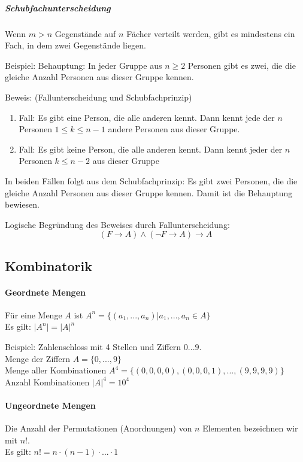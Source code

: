 \documentclass[a4paper]{scrartcl}
\begin{document}
\subparagraph{Schubfachunterscheidung} Wenn $m > n$ Gegenstände auf $n$ Fächer verteilt werden, gibt es mindestens ein Fach, in dem zwei Gegenstände liegen.

Beispiel: Behauptung: In jeder Gruppe aus $n\geq 2$ Personen gibt es zwei, die die gleiche Anzahl Personen aus dieser Gruppe kennen.

Beweis: (Fallunterscheidung und Schubfachprinzip)
\begin{enumerate}
\item Fall: \label{1.Fall} Es gibt eine Person, die alle anderen kennt. Dann kennt jede der $n$ Personen $1\leq k \leq n-1$ andere Personen aus dieser Gruppe.
\item Fall: \label{2. Fall}Es gibt keine Person, die alle anderen kennt. Dann kennt jeder der $n$ Personen $k \leq n-2$ aus dieser Gruppe
\end{enumerate}
In beiden Fällen folgt aus dem Schubfachprinzip: Es gibt zwei Personen, die die gleiche Anzahl Personen aus dieser Gruppe kennen. Damit ist die Behauptung bewiesen.

Logische Begründung des Beweises durch Fallunterscheidung:
\[(F\rightarrow A) \wedge (\neg F \rightarrow A) \rightarrow A\]

\subsection{Kombinatorik}
\paragraph{Geordnete Mengen}
Für eine Menge $A$ ist $A^n = \{ (a_1,...,a_n)|a_1,...,a_n \in A\}$\\
Es gilt: $\lvert A^n\rvert = \lvert A\rvert ^n$

Beispiel: Zahlenschloss mit 4 Stellen und Ziffern $0 ... 9$.\\
Menge der Ziffern $A=\{0,...,9\}$\\
Menge aller Kombinationen $A^4 = \{(0,0,0,0),(0,0,0,1),...,(9,9,9,9)\}$\\
Anzahl Kombinationen $\lvert A \rvert ^4 = 10^4$

\paragraph{Ungeordnete Mengen} Die Anzahl der Permutationen (Anordnungen) von $n$ Elementen bezeichnen wir mit $n!$.\\
Es gilt: $n!= n \cdot (n-1) \cdot ... \cdot 1$
\end{document}
